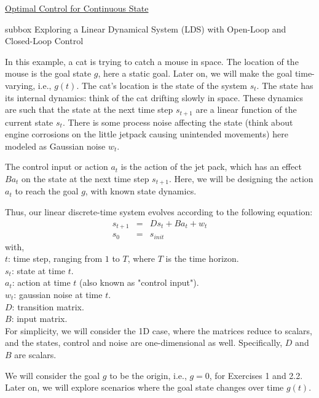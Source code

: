 \begin{textbox}{\href{https://compneuro.neuromatch.io/tutorials/W3D3_OptimalControl/student/W3D3_Tutorial2.html}{Optimal Control for Continuous State}}
\begin{subbox}{subbox}{ Exploring a Linear Dynamical System (LDS) with Open-Loop and Closed-Loop Control}
\scriptsize


In this example, a cat is trying to catch a mouse in space. The location of the mouse is the goal state $g$, here a static goal. Later on, we will make the goal time-varying, i.e., $g(t)$. The cat's location is the state of the system $s_t$. The state has its internal dynamics: think of the cat drifting slowly in space. These dynamics are such that the state at the next time step $s_{t+1}$ are a linear function of the current state $s_t$. There is some process noise affecting the state (think about engine corrosions on the little jetpack causing unintended movements) here modeled as Gaussian noise $w_t$.

The control input or action $a_t$ is the action of the jet pack, which has an effect $Ba_t$ on the state at the next time step $s_{t+1}$. Here, we will be designing the action $a_t$ to reach the goal $g$, with known state dynamics.

Thus, our linear discrete-time system evolves according to the following equation:
\begin{eqnarray*}
s_{t+1} &=& Ds_t + Ba_t + w_t \tag{1}\\
s_{0} &=& s_{init}
\end{eqnarray*}
with,\\
$t$: time step, ranging from $1$ to $T$, where $T$ is the time horizon.\\
$s_t$: state at time $t$.\\
$a_t$: action at time $t$ (also known as "control input").\\
$w_t$: gaussian noise at time $t$.\\
$D$: transition matrix.\\
$B$: input matrix.\\

For simplicity, we will consider the 1D case, where the matrices reduce to scalars, and the states, control and noise are one-dimensional as well. Specifically, $D$ and $B$ are scalars.

We will consider the goal $g$ to be the origin, i.e., $g=0$, for Exercises 1 and 2.2. Later on, we will explore scenarios where the goal state changes over time $g(t)$.\\




\end{subbox}
\end{textbox}

